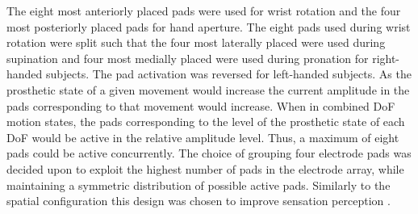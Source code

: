 The eight most anteriorly placed pads were used for wrist rotation and the four most posteriorly placed pads for hand aperture. The eight pads used during wrist rotation were split such that the four most laterally placed were used during supination and four most medially placed were used during pronation for right-handed subjects. The pad activation was reversed for left-handed subjects. As the prosthetic state of a given movement would increase the current amplitude in the pads corresponding to that movement would increase. When in combined DoF motion states, the pads corresponding to the level of the prosthetic state of each DoF would be active in the relative amplitude level. Thus, a maximum of eight pads could be active concurrently. The choice of grouping four electrode pads was decided upon to exploit the highest number of pads in the electrode array, while maintaining a symmetric distribution of possible active pads. Similarly to the spatial configuration this design was chosen to improve sensation perception \cite{Dosen2015}.


